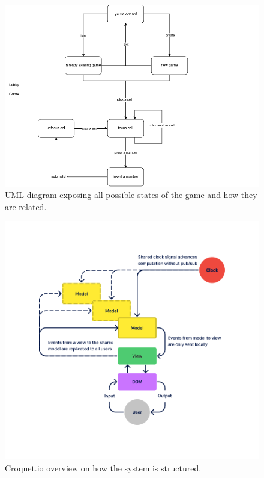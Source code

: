 \documentclass[12pt, a4paper]{report}
\begin{document}
\begin{figure}
    \centering
    \includegraphics[scale=0.5]{part2a-states.png}
    \caption{UML diagram exposing all possible states of the game and how they are related.}
\end{figure}

\begin{figure}
    \centering
    \includegraphics[scale=0.5]{croquet_overview.png}
    \caption{Croquet.io overview on how the system is structured.}
\end{figure}



\end{document}
